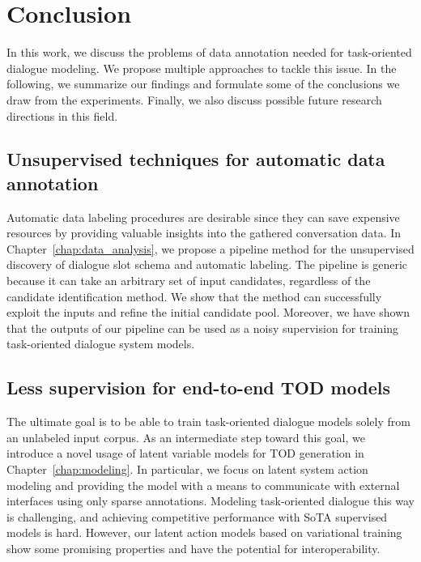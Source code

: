 \chapter{Conclusion}
\label{chap:conclusion}
In this work, we discuss the problems of data annotation needed for task-oriented dialogue modeling.
We propose multiple approaches to tackle this issue.
In the following, we summarize our findings and formulate some of the conclusions we draw from the experiments.
Finally, we also discuss possible future research directions in this field.

\section{Unsupervised techniques for automatic data annotation}
Automatic data labeling procedures are desirable since they can save expensive resources by providing valuable insights into the gathered conversation data.
In Chapter~\ref{chap:data_analysis}, we propose a pipeline method for the unsupervised discovery of dialogue slot schema and automatic labeling.
The pipeline is generic because it can take an arbitrary set of input candidates, regardless of the candidate identification method.
We show that the method can successfully exploit the inputs and refine the initial candidate pool.
Moreover, we have shown that the outputs of our pipeline can be used as a noisy supervision for training task-oriented dialogue system models.

\section{Less supervision for end-to-end TOD models}
The ultimate goal is to be able to train task-oriented dialogue models solely from an unlabeled input corpus.
As an intermediate step toward this goal, we introduce a novel usage of latent variable models for TOD generation in Chapter~\ref{chap:modeling}.
In particular, we focus on latent system action modeling and providing the model with a means to communicate with external interfaces using only sparse annotations.
Modeling task-oriented dialogue this way is challenging, and achieving competitive performance with SoTA supervised models is hard.
However, our latent action models based on variational training show some promising properties and have the potential for interoperability.

